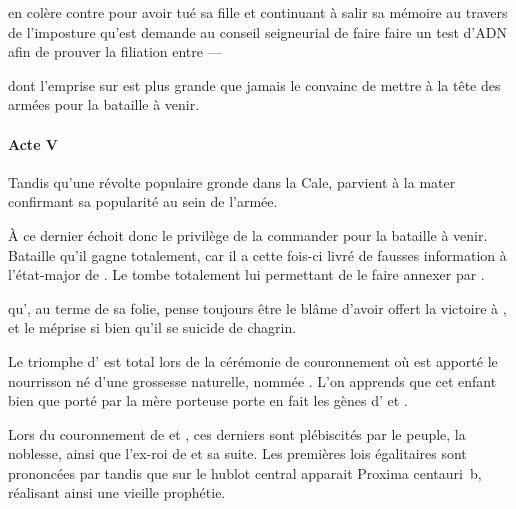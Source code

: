 \reine{} en colère contre \elena{} pour avoir tué sa fille et continuant à salir sa mémoire au travers de l’imposture qu’est \ela{} demande au conseil seigneurial de faire faire un test d’ADN afin de prouver la filiation entre \elena{}—\princesse{}

\ela{} dont l’emprise sur \roi{} est plus grande que jamais le convainc de mettre \elena{} à la tête des armées pour la bataille à venir.

\paragraph{Acte V}
Tandis qu’une révolte populaire gronde dans la Cale, \elena{} parvient à la mater confirmant sa popularité au sein de l’armée.

À ce dernier échoit donc le privilège de la commander pour la bataille à venir. Bataille qu’il gagne totalement, car il a cette fois-ci livré de fausses information à l’état-major de \campoppose{}. Le \campoppose{} tombe totalement lui permettant de le faire annexer par \campprincipal{}.

\ela{} qu’\roi{}, au terme de sa folie, pense toujours être \princesse{} le blâme d’avoir offert la victoire à \elena{}, et le méprise si bien qu’il se suicide de chagrin.

Le triomphe d’\elena{} est total lors de la cérémonie de couronnement où est apporté le nourrisson né d’une grossesse naturelle, nommée \cleopatre{}. L’on apprends que cet enfant bien que porté par la mère porteuse \catin{} porte en fait les gènes d’\elena{} et \ela{}.

Lors du couronnement de \elena{} et \ela{}, ces derniers sont plébiscités par le peuple, la noblesse, ainsi que l’ex-roi de \campoppose{} et sa suite. Les premières lois égalitaires sont prononcées par \elena{} tandis que sur le hublot central apparait Proxima centauri~b, réalisant ainsi une vieille prophétie.

